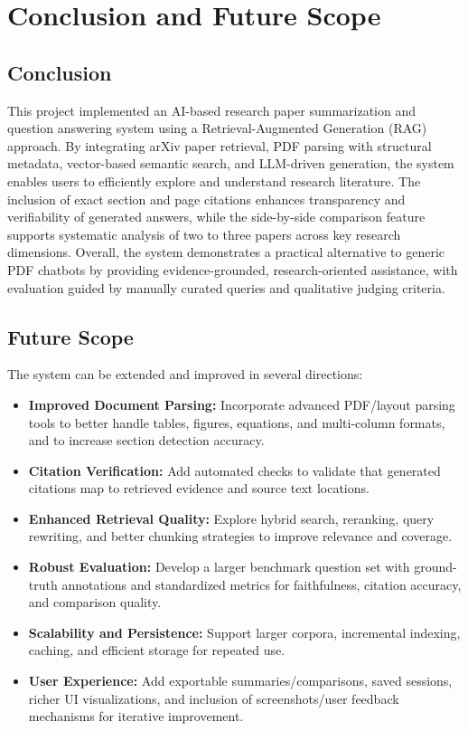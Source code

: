 \chapter{Conclusion and Future Scope}

\section{Conclusion}
This project implemented an AI-based research paper summarization and question answering system using a Retrieval-Augmented Generation (RAG) approach. By integrating arXiv paper retrieval, PDF parsing with structural metadata, vector-based semantic search, and LLM-driven generation, the system enables users to efficiently explore and understand research literature. The inclusion of exact section and page citations enhances transparency and verifiability of generated answers, while the side-by-side comparison feature supports systematic analysis of two to three papers across key research dimensions. Overall, the system demonstrates a practical alternative to generic PDF chatbots by providing evidence-grounded, research-oriented assistance, with evaluation guided by manually curated queries and qualitative judging criteria.

\section{Future Scope}
The system can be extended and improved in several directions:
\begin{itemize}
    \item \textbf{Improved Document Parsing:} Incorporate advanced PDF/layout parsing tools to better handle tables, figures, equations, and multi-column formats, and to increase section detection accuracy.
    \item \textbf{Citation Verification:} Add automated checks to validate that generated citations map to retrieved evidence and source text locations.
    \item \textbf{Enhanced Retrieval Quality:} Explore hybrid search, reranking, query rewriting, and better chunking strategies to improve relevance and coverage.
    \item \textbf{Robust Evaluation:} Develop a larger benchmark question set with ground-truth annotations and standardized metrics for faithfulness, citation accuracy, and comparison quality.
    \item \textbf{Scalability and Persistence:} Support larger corpora, incremental indexing, caching, and efficient storage for repeated use.
    \item \textbf{User Experience:} Add exportable summaries/comparisons, saved sessions, richer UI visualizations, and inclusion of screenshots/user feedback mechanisms for iterative improvement.
\end{itemize}